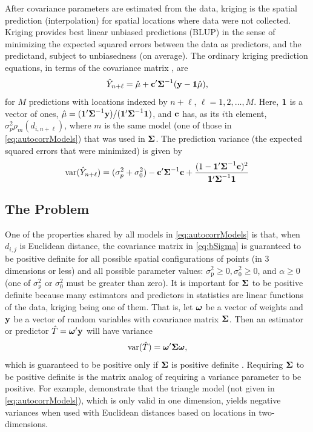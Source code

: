 \documentclass[11pt, titlepage]{article}\usepackage[]{graphicx}\usepackage[]{color}
\begin{document}
\begin{spacing}{1.9}
\begin{flushleft}
After covariance parameters are estimated from the data, kriging is the spatial prediction (interpolation) for spatial locations where data were not collected.  Kriging provides best linear unbiased predictions (BLUP) in the sense of minimizing the expected squared errors between the data as predictors, and the predictand, subject to unbiasedness (on average). The ordinary kriging prediction equations, in terms of the covariance matrix \citep[][p.33]{Scha:Gotw:stat:2005}, are
\begin{equation} \label{eq:OK}
	\hat{Y}_{n+\ell} = \hat{\mu} + \mathbf{c}^{\prime}\mbox{\boldmath $\Sigma$}^{-1}(\mathbf{y} - \mathbf{1}\hat{\mu}), 
\end{equation}
for $M$ predictions with locations indexed by $n+\ell$, $\ell = 1,2,\ldots,M$. Here, $\mathbf{1}$ is a vector of ones, $\hat{\mu} = (\mathbf{1}^{\prime}\mbox{\boldmath $\Sigma$}^{-1}\mathbf{y})/(\mathbf{1}^{\prime}\mbox{\boldmath $\Sigma$}^{-1}\mathbf{1})$, and $\mathbf{c}$ has, as its $i$th element, $\sigma^2_p\rho_m(d_{i,n+\ell})$, where $m$ is the same model (one of those in \ref{eq:autocorrModels}) that was used in $\mbox{\boldmath $\Sigma$}$. The prediction variance (the expected squared errors that were minimized) is given by
\begin{equation} \label{eq:OKse}
	\textrm{var}(\hat{Y}_{n+\ell}) = (\sigma^2_p + \sigma^2_0) - \mathbf{c}^{\prime}\mbox{\boldmath $\Sigma$}^{-1}\mathbf{c} + \frac{(1 - \mathbf{1}^{\prime}\mbox{\boldmath $\Sigma$}^{-1}\mathbf{c})^2}{\mathbf{1}^{\prime}\mbox{\boldmath $\Sigma$}^{-1}\mathbf{1}}
\end{equation}


\subsection*{The Problem}

One of the properties shared by all models in \ref{eq:autocorrModels} is that, when $d_{i,j}$ is Euclidean distance, the covariance matrix in \ref{eq:bSigma} is guaranteed to be positive definite for all possible spatial configurations of points (in 3 dimensions or less) and all possible parameter values:  $\sigma^2_\textrm{p} \ge 0, \sigma^2_0 \ge 0$, and $\alpha \ge 0$ (one of $\sigma^2_\textrm{p}$ or $\sigma^2_0$ must be greater than zero). It is important for $\mbox{\boldmath $\Sigma$}$ to be positive definite because many estimators and predictors in statistics are linear functions of the data, kriging being one of them.  That is, let $\mbox{\boldmath $\omega$}$ be a vector of weights and $\mathbf{y}$ be a vector of random variables with covariance matrix $\mbox{\boldmath $\Sigma$}$.  Then an estimator or predictor $\hat{T} = \mbox{\boldmath $\omega$}^{\prime}\mathbf{y}$ will have variance
\begin{equation} \label{eq:quadForm}
  \textrm{var}(\hat{T}) = \mbox{\boldmath $\omega$}^{\prime}\mbox{\boldmath $\Sigma$}\mbox{\boldmath $\omega$},
\end{equation}
which is guaranteed to be positive only if $\mbox{\boldmath $\Sigma$}$ is positive definite \citep{Guil:Schi:Porc:Bevi:vali:2014}.  Requiring $\mbox{\boldmath $\Sigma$}$ to be positive definite is the matrix analog of requiring a variance parameter to be positive. For example, \citet{Guil:Schi:Porc:Bevi:vali:2014} demonstrate that the triangle model (not given in \ref{eq:autocorrModels}), which is only valid in one dimension, yields negative variances when used with Euclidean distances based on locations in two-dimensions.


\end{flushleft}
\end{spacing}
\end{document}
